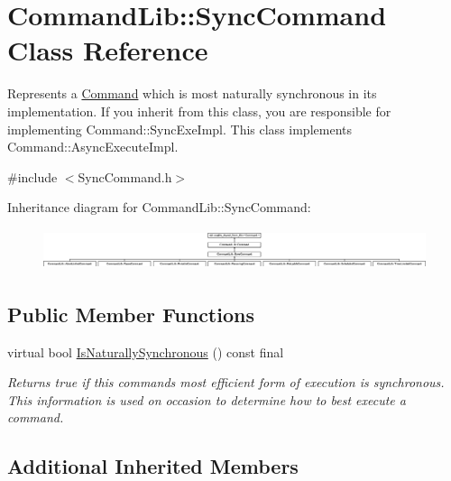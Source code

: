\hypertarget{class_command_lib_1_1_sync_command}{}\section{Command\+Lib\+:\+:Sync\+Command Class Reference}
\label{class_command_lib_1_1_sync_command}


Represents a \mbox{\hyperlink{class_command_lib_1_1_command}{Command}} which is most naturally synchronous in its implementation. If you inherit from this class, you are responsible for implementing Command\+::\+Sync\+Exe\+Impl. This class implements Command\+::\+Async\+Execute\+Impl.  




{\ttfamily \#include $<$Sync\+Command.\+h$>$}

Inheritance diagram for Command\+Lib\+:\+:Sync\+Command\+:\begin{figure}[H]
\begin{center}
\leavevmode
\includegraphics[height=1.216730cm]{class_command_lib_1_1_sync_command}
\end{center}
\end{figure}
\subsection*{Public Member Functions}
\begin{DoxyCompactItemize}
\item 
\mbox{\label{class_command_lib_1_1_sync_command_a7541276e393c002979ed54523116b12e}} 
virtual bool \mbox{\hyperlink{class_command_lib_1_1_sync_command_a7541276e393c002979ed54523116b12e}{Is\+Naturally\+Synchronous}} () const final
\begin{DoxyCompactList}\small\item\em Returns true if this command\textquotesingle{}s most efficient form of execution is synchronous. This information is used on occasion to determine how to best execute a command.  \end{DoxyCompactList}\end{DoxyCompactItemize}
\subsection*{Additional Inherited Members}



